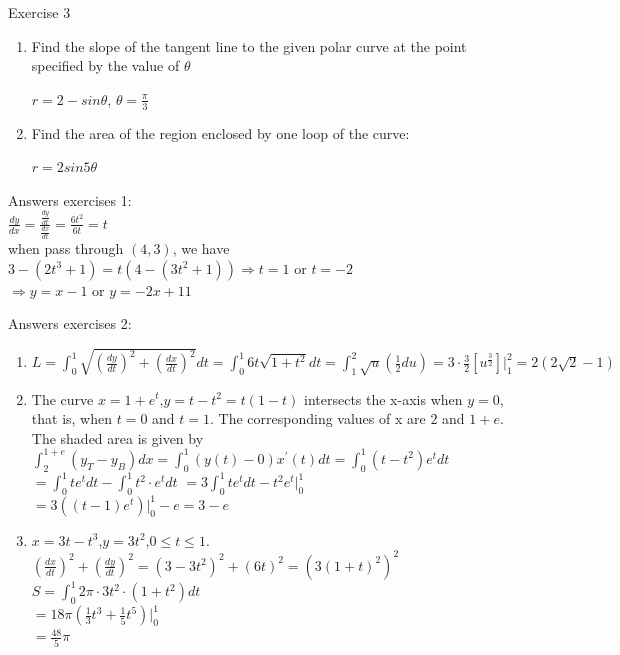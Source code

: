\begin{frame}{Exercise 3 }
    \begin{enumerate}
        \item Find the slope of the tangent line to the given polar curve at the point specified by the value of $\theta$
              \begin{center}
                  $r=2-sin\theta$, $\theta=\frac{\pi}{3}$
              \end{center}
        \item
              Find the area of the region enclosed by one loop of the curve:
              \begin{center}
                  $r=2 sin5\theta$
              \end{center}
    \end{enumerate}
\end{frame}

\begin{frame}{Answers}
    exercises 1:\\
    $\frac{dy}{dx}=\frac{\frac{dy}{dt}}{\frac{dx}{dt}}=\frac{6t^2}{6t}=t$\\
    when pass through $(4,3)$, we have $3-(2t^3+1)=t(4-(3t^2+1)) \Rightarrow t=1$ or $t=-2$\\
    $\Rightarrow y=x-1$ or $y=-2x+11$\\
\end{frame}
\begin{frame}{Answers}
    exercises 2:
    \begin{enumerate}
        \item
              $L=\int_0^1\sqrt{(\frac{dy}{dt})^2+(\frac{dx}{dt})^2} dt=\int_0^1 6t \sqrt{1+t^2}dt = \int_1^2 \sqrt{u}(\frac{1}{2}d u)= 3 \cdot \frac{3}{2} [u ^ {\frac{3}{2}}]|_1^2= 2(2\sqrt{2}-1)$
        \item
              The curve $x = 1+e^t$,$y = t-t^2=t(1-t)$ intersects the x-axis when $y = 0$, that is, when $t = 0$ and $t = 1$. The corresponding values of x are $2$ and $1+e$. The shaded area is given by
              $\int_2^{1+e} (y_T-y_B) dx = \int_0^1 (y(t)-0) x^{\prime}(t) dt=\int _0^1 (t-t^2)e^t dt $\\
              $=\int _0^1 t e^t dt - \int_0^1 t^2 \cdot e^t dt$
              $= 3\int_0^1 t e^t dt - t^2 e^t|_0^1$\\
              $=3((t-1)e^t)|_0^1 - e =3-e$
        \item
              $x=3t-t^3$,$y=3t^2$,$0 \leqslant t \leqslant 1$.\\
              $(\frac{dx}{dt})^2+(\frac{dy}{dt})^2=(3-3t^2)^2+(6t)^2=(3(1+t)^2)^2$\\
              $S=\int_0^1 2\pi \cdot 3t^2 \cdot (1+t^2) dt$\\
              $=18\pi(\frac{1}{3} t^3 + \frac{1}{5} t^5)|_0^1$\\
              $=\frac{48}{5}\pi$
    \end{enumerate}
\end{frame}

